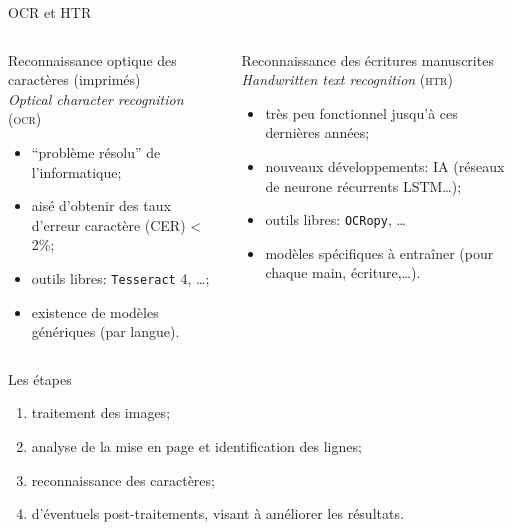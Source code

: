 \documentclass[10pt, compress,urlcolor=blue]{beamer}
\begin{document}
\begin{frame}{OCR et HTR}
    
    \begin{columns}
	\begin{column}{0.48\textwidth}
		Reconnaissance optique des caractères (imprimés)\\
		\textit{Optical character recognition} (\textsc{ocr})
		\begin{itemize}
		    \item ``problème résolu'' de l'informatique;
		    \item aisé d'obtenir des taux d'erreur caractère (CER) < 2\%;
		    \item outils libres: \texttt{Tesseract} 4, …;
		    \item existence de modèles génériques (par langue).
		\end{itemize}
	\end{column}
	\begin{column}{0.48\textwidth}
		Reconnaissance des écritures manuscrites\\
		\textit{Handwritten text recognition} (\textsc{htr})
		\begin{itemize}
		    \item très peu fonctionnel jusqu'à ces dernières années;
		    \item nouveaux développements: IA (réseaux de neurone récurrents LSTM…);
		    \item outils libres: \texttt{OCRopy}, …
		    \item modèles spécifiques à entraîner (pour chaque main, écriture,…).
		\end{itemize}
	\end{column}
\end{columns}
    
\end{frame}




\begin{frame}{Les étapes}
		\begin{enumerate}
			\item traitement des images;
			\item analyse de la mise en page et identification des lignes;
			\item reconnaissance des caractères;
			\item d'éventuels post-traitements, visant à améliorer les résultats.
		\end{enumerate}
	\end{frame}
	
\end{document}
